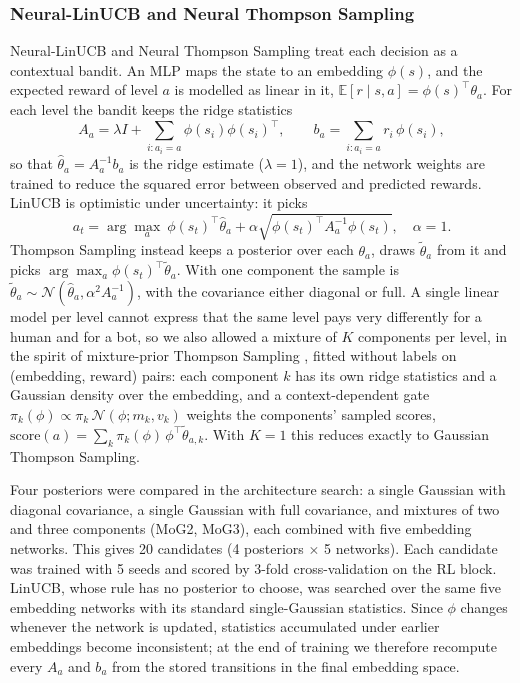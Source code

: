 \documentclass{ieeetj}
\begin{document}
\subsubsection{Neural-LinUCB and Neural Thompson Sampling}
Neural-LinUCB and Neural Thompson Sampling \cite{li_linucb_2010,russo_ts_2018,riquelme_2018} treat each decision as a contextual bandit. An MLP maps the state to an embedding $\phi(s)$, and the expected reward of level $a$ is modelled as linear in it, $\mathbb E[r\mid s,a]=\phi(s)^\top\theta_a$. For each level the bandit keeps the ridge statistics
\begin{equation}
A_a=\lambda I+\sum_{i:a_i=a}\phi(s_i)\phi(s_i)^\top,\qquad b_a=\sum_{i:a_i=a}r_i\,\phi(s_i),
\end{equation}
so that $\hat\theta_a=A_a^{-1}b_a$ is the ridge estimate ($\lambda=1$), and the network weights are trained to reduce the squared error between observed and predicted rewards. LinUCB is optimistic under uncertainty: it picks
\begin{equation}
a_t=\arg\max_a\ \phi(s_t)^\top\hat\theta_a+\alpha\sqrt{\phi(s_t)^\top A_a^{-1}\phi(s_t)},\quad \alpha=1.
\end{equation}
Thompson Sampling instead keeps a posterior over each $\theta_a$, draws $\tilde\theta_a$ from it and picks $\arg\max_a\phi(s_t)^\top\tilde\theta_a$. With one component the sample is $\tilde\theta_a\sim\mathcal N(\hat\theta_a,\alpha^2A_a^{-1})$, with the covariance either diagonal or full. A single linear model per level cannot express that the same level pays very differently for a human and for a bot, so we also allowed a mixture of $K$ components per level, in the spirit of mixture-prior Thompson Sampling \cite{hong_mixts_2022}, fitted without labels on (embedding, reward) pairs: each component $k$ has its own ridge statistics and a Gaussian density over the embedding, and a context-dependent gate $\pi_k(\phi)\propto\pi_k\,\mathcal N(\phi;m_k,v_k)$ weights the components' sampled scores, $\text{score}(a)=\sum_k\pi_k(\phi)\,\phi^\top\tilde\theta_{a,k}$. With $K=1$ this reduces exactly to Gaussian Thompson Sampling. 

Four posteriors were compared in the architecture search: a single Gaussian with diagonal covariance, a single Gaussian with full covariance, and mixtures of two and three components (MoG2, MoG3), each combined with five embedding networks. 
This gives 20 candidates (4 posteriors $\times$ 5 networks).
Each candidate was trained with 5 seeds and scored by 3-fold cross-validation on the RL block. 
LinUCB, whose rule has no posterior to choose, was searched over the same five embedding networks with its standard single-Gaussian statistics. 
Since $\phi$ changes whenever the network is updated, statistics accumulated under earlier embeddings become inconsistent; at the end of training we therefore recompute every $A_a$ and $b_a$ from the stored transitions in the final embedding space.
\end{document}
